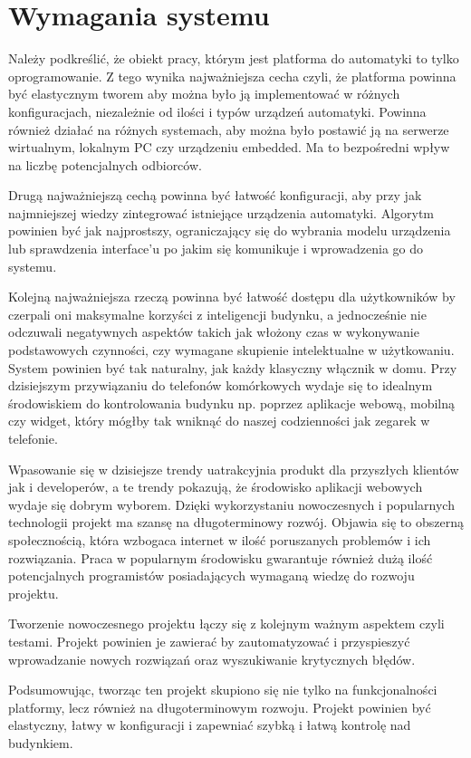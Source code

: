 \chapter{Wymagania systemu}
Należy podkreślić, że obiekt pracy, którym jest platforma do automatyki to tylko oprogramowanie. Z tego wynika najważniejsza cecha czyli, że platforma powinna być elastycznym tworem aby można było ją implementować w różnych konfiguracjach,  niezależnie od ilości i typów urządzeń automatyki. Powinna również działać na różnych systemach, aby można było postawić ją na serwerze wirtualnym, lokalnym PC czy urządzeniu embedded. Ma to bezpośredni wpływ na liczbę potencjalnych odbiorców. \par Drugą najważniejszą cechą powinna być łatwość konfiguracji, aby przy jak najmniejszej wiedzy zintegrować istniejące urządzenia automatyki. Algorytm powinien być jak najprostszy, ograniczający się do wybrania modelu urządzenia lub sprawdzenia interface'u po jakim się komunikuje i wprowadzenia go do systemu. 
\par Kolejną najważniejsza rzeczą powinna być łatwość dostępu dla użytkowników by czerpali oni maksymalne korzyści z inteligencji budynku, a jednocześnie nie odczuwali negatywnych aspektów takich jak włożony czas w wykonywanie podstawowych czynności, czy wymagane skupienie intelektualne w użytkowaniu. System powinien być tak naturalny, jak każdy klasyczny włącznik w domu. Przy dzisiejszym przywiązaniu do telefonów komórkowych wydaje się to idealnym środowiskiem do kontrolowania budynku np. poprzez aplikacje webową, mobilną czy widget, który mógłby tak wniknąć do naszej codzienności jak zegarek w telefonie. \par
Wpasowanie się w dzisiejsze trendy uatrakcyjnia produkt dla przyszłych klientów jak i developerów, a te trendy pokazują, że środowisko aplikacji webowych wydaje się dobrym wyborem. Dzięki wykorzystaniu nowoczesnych i popularnych technologii projekt ma szansę na długoterminowy rozwój. Objawia się to obszerną społecznością, która wzbogaca internet w ilość poruszanych problemów i ich rozwiązania. Praca w popularnym środowisku gwarantuje również dużą ilość potencjalnych programistów posiadających wymaganą wiedzę do rozwoju projektu.
\par Tworzenie nowoczesnego projektu łączy się z kolejnym ważnym aspektem czyli testami. Projekt powinien je zawierać by zautomatyzować i przyspieszyć wprowadzanie nowych rozwiązań oraz wyszukiwanie krytycznych błędów. 
\par Podsumowując, tworząc ten projekt skupiono się nie tylko na funkcjonalności platformy, lecz również na długoterminowym rozwoju. Projekt powinien być elastyczny, łatwy w konfiguracji i zapewniać szybką i łatwą kontrolę nad budynkiem. 